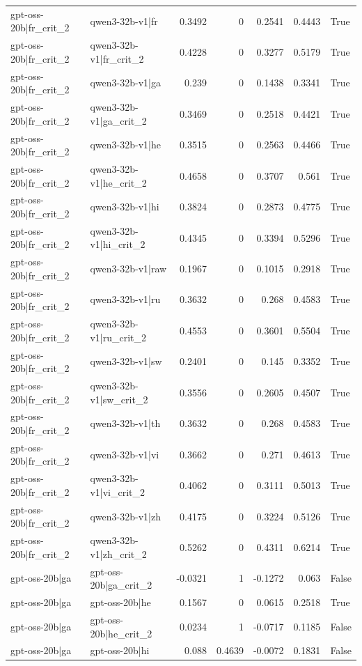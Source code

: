 \begin{table}
\begin{tabular}{l l r r r r l}
gpt-oss-20b|fr_crit_2 & qwen3-32b-v1|fr & 0.3492 & 0 & 0.2541 & 0.4443 & True \\
gpt-oss-20b|fr_crit_2 & qwen3-32b-v1|fr_crit_2 & 0.4228 & 0 & 0.3277 & 0.5179 & True \\
gpt-oss-20b|fr_crit_2 & qwen3-32b-v1|ga & 0.239 & 0 & 0.1438 & 0.3341 & True \\
gpt-oss-20b|fr_crit_2 & qwen3-32b-v1|ga_crit_2 & 0.3469 & 0 & 0.2518 & 0.4421 & True \\
gpt-oss-20b|fr_crit_2 & qwen3-32b-v1|he & 0.3515 & 0 & 0.2563 & 0.4466 & True \\
gpt-oss-20b|fr_crit_2 & qwen3-32b-v1|he_crit_2 & 0.4658 & 0 & 0.3707 & 0.561 & True \\
gpt-oss-20b|fr_crit_2 & qwen3-32b-v1|hi & 0.3824 & 0 & 0.2873 & 0.4775 & True \\
gpt-oss-20b|fr_crit_2 & qwen3-32b-v1|hi_crit_2 & 0.4345 & 0 & 0.3394 & 0.5296 & True \\
gpt-oss-20b|fr_crit_2 & qwen3-32b-v1|raw & 0.1967 & 0 & 0.1015 & 0.2918 & True \\
gpt-oss-20b|fr_crit_2 & qwen3-32b-v1|ru & 0.3632 & 0 & 0.268 & 0.4583 & True \\
gpt-oss-20b|fr_crit_2 & qwen3-32b-v1|ru_crit_2 & 0.4553 & 0 & 0.3601 & 0.5504 & True \\
gpt-oss-20b|fr_crit_2 & qwen3-32b-v1|sw & 0.2401 & 0 & 0.145 & 0.3352 & True \\
gpt-oss-20b|fr_crit_2 & qwen3-32b-v1|sw_crit_2 & 0.3556 & 0 & 0.2605 & 0.4507 & True \\
gpt-oss-20b|fr_crit_2 & qwen3-32b-v1|th & 0.3632 & 0 & 0.268 & 0.4583 & True \\
gpt-oss-20b|fr_crit_2 & qwen3-32b-v1|vi & 0.3662 & 0 & 0.271 & 0.4613 & True \\
gpt-oss-20b|fr_crit_2 & qwen3-32b-v1|vi_crit_2 & 0.4062 & 0 & 0.3111 & 0.5013 & True \\
gpt-oss-20b|fr_crit_2 & qwen3-32b-v1|zh & 0.4175 & 0 & 0.3224 & 0.5126 & True \\
gpt-oss-20b|fr_crit_2 & qwen3-32b-v1|zh_crit_2 & 0.5262 & 0 & 0.4311 & 0.6214 & True \\
gpt-oss-20b|ga & gpt-oss-20b|ga_crit_2 & -0.0321 & 1 & -0.1272 & 0.063 & False \\
gpt-oss-20b|ga & gpt-oss-20b|he & 0.1567 & 0 & 0.0615 & 0.2518 & True \\
gpt-oss-20b|ga & gpt-oss-20b|he_crit_2 & 0.0234 & 1 & -0.0717 & 0.1185 & False \\
gpt-oss-20b|ga & gpt-oss-20b|hi & 0.088 & 0.4639 & -0.0072 & 0.1831 & False \\

\end{tabular}
\end{table}
